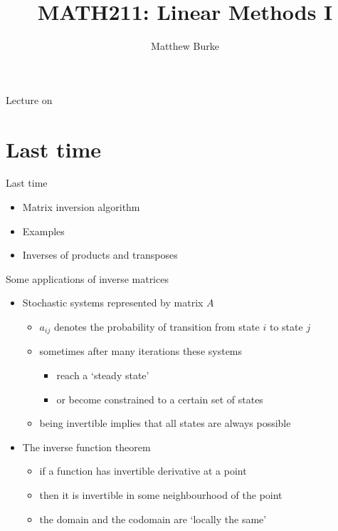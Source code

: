 \documentclass{beamer}
\title{MATH211: Linear Methods I}
\author{Matthew Burke}
\date{\lectureDate}
\newcommand{\lectureDate}{\formatdate{25}{09}{2018}}
\begin{document}
\frame{\titlepage}

\begin{frame}{Lecture on \lectureDate}
  \tableofcontents
\end{frame}

\section*{Last time}
\label{sec:Last-time}

\begin{frame}{Last time}
  \begin{itemize}
  \item Matrix inversion algorithm\vfill
  \item Examples\vfill
  \item Inverses of products and transposes
  \end{itemize}
\end{frame}

\begin{frame}{Some applications of inverse matrices}
  \begin{itemize}
  \item Stochastic systems represented by matrix $A$
    \begin{itemize}
    \item $a_{ij}$ denotes the probability of transition from state $i$ to state $j$
    \item sometimes after many iterations these systems
      \begin{itemize}
      \item reach a `steady state'
      \item or become constrained to a certain set of states
      \end{itemize}
    \item being invertible implies that all states are always possible
    \end{itemize}\vfill
  \item The inverse function theorem
    \begin{itemize}
    \item if a function has invertible derivative at a point
    \item then it is invertible in some neighbourhood of the point
    \item the domain and the codomain are `locally the same'
    \end{itemize}
  \end{itemize}
\end{frame}
\end{document}
